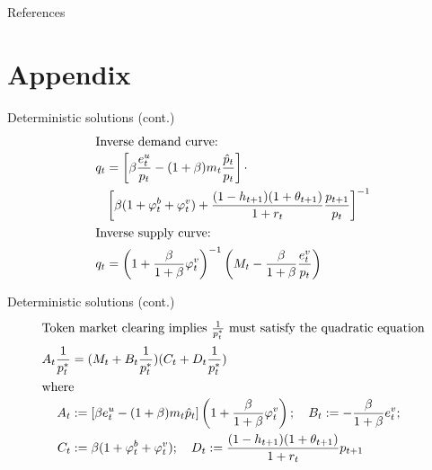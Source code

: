 \documentclass{beamer}
\begin{document}


\section*{}
\begin{frame}{References}
    \printbibliography
\end{frame}


\section{Appendix}
\begin{frame}[noframenumbering]{Deterministic solutions (cont.)}
    \label{det_math}
    \begin{align}
        \intertext{Inverse demand curve:}
        q_t &= \left[ \beta \frac{e_t^u}{p_t} - (1+\beta)m_t \frac{\hat{p}_t}{p_t} \right] \cdot\\
            & \left[\beta(1+ \varphi_t^b+\varphi_t^v) + \frac{(1-h_{t+1})(1+\theta_{t+1})}{1+r_t} \frac{p_{t+1}}{p_t}\right]^{-1}\\
        \intertext{Inverse supply curve:}
        q_t &= \left(1+\frac{\beta}{1+\beta}\varphi_t^v\right)^{-1} \left(M_t - \frac{\beta}{1+\beta}\frac{e_t^v}{p_t}\right)
    \end{align}
    
\end{frame}

\begin{frame}[noframenumbering]{Deterministic solutions (cont.)}
    \begin{align}
        \intertext{Token market clearing implies $\frac{1}{p_t^*}$ must satisfy the quadratic equation}
        A_t \frac{1}{p_t^*} &= (M_t + B_t\frac{1}{p_t^*}) (C_t + D_t\frac{1}{p_t^*}) \\
        \intertext{where}
        A_t &:= \left[ \beta e_t^u - (1+\beta)m_t \hat{p}_t \right] \left(1+\frac{\beta}{1+\beta}\varphi_t^v\right);\quad
        B_t := - \frac{\beta}{1+\beta} e_t^v;\\
        C_t &:= \beta(1+ \varphi_t^b+\varphi_t^v);\quad
        D_t := \frac{(1-h_{t+1})(1+\theta_{t+1})}{1+r_t} p_{t+1}
        \end{align}
\end{frame}
\end{document}
